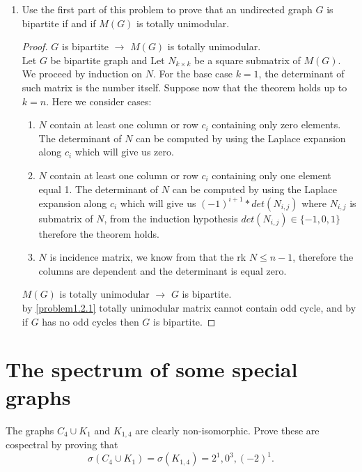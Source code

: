 \documentclass[a4paper, 11pt, oneside]{article}
\newenvironment{problem}[1]
  {\renewcommand\theinnercustomprob{#1}\innercustomprob}
  {\endinnercustomprob}
\begin{document}
\begin{problem}{1.2}
\begin{enumerate}[label=1.2.\arabic*]
\item Use the first part of this problem to prove that an undirected graph $G$ is bipartite if and if $M(G)$ is totally unimodular.
\begin{proof}
$G$ is bipartite $\rightarrow$ $M(G)$ is totally unimodular.\\ 
Let $G$ be bipartite graph and Let $N_{k\times k}$ be a square submatrix of $M(G)$. We proceed by induction on $N$. For the base case $k = 1$, the determinant of such matrix is the number itself. Suppose now that the theorem holds up to $k=n$. Here we consider cases:
\begin{enumerate}[label=(\alph*)]
\item $N$ contain at least one column or row $c_i$ containing only zero elements. The determinant of $N$ can be computed by using the Laplace expansion along $c_i$ which will give us zero.
\item $N$ contain at least one column or row $c_i$ containing only one element equal 1. The determinant of $N$ can be computed by using the Laplace expansion along $c_i$ which will give us $(-1)^{i+ 1} * det(N_{i,j})$ where $N_{i,j}$ is submatrix of $N$, from the induction hypothesis $det(N_{i,j}) \in\{-1, 0, 1\}$ therefore the theorem holds.
\item $N$ is incidence matrix, we know from \cite[Theorem 10]{konig_egervary}  that the rk $N \leq n - 1$, therefore the columns are dependent and the determinant is equal zero.
\end{enumerate}
$M(G)$ is totally unimodular $\rightarrow$ $G$ is bipartite.\\ 
by \ref{problem1.2.1} totally unimodular matrix cannot contain odd cycle, and by \cite{bipartite_odd_cycles} if $G$ has no odd cycles then $G$ is bipartite.
\end{proof}
\end{enumerate}
\end{problem}

\section{The spectrum of some special graphs}

\begin{problem}{2.1}\label{problem2.1}
The graphs $C_4\cup K_1$ and $K_{1,4}$ are clearly non-isomorphic. Prove these are cospectral by proving that 
\begin{equation*}
\sigma(C_4\cup K_1) = \sigma(K_{1,4}) = 2^1, 0^3, (-2)^1.
\end{equation*}
\end{problem}
\end{document}
